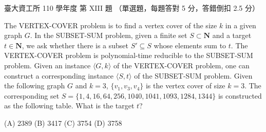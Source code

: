 \begin{pastexam}[label={px:npc-4}]{臺大資工所 110 學年度 第 XIII 題}
（單選題，每題答對 5 分，答錯倒扣 2.5 分）

The VERTEX-COVER problem is to find a vertex cover of the size $k$ in a given graph $G$. In the
SUBSET-SUM problem, given a finite set $S\subset\mathbf{N}$ and a target $t\in\mathbf{N}$, we ask whether
there is a subset $S'\subseteq S$ whose elements sum to $t$. The VERTEX-COVER problem is polynomial-time
reducible to the SUBSET-SUM problem. Given an instance $\langle G,k\rangle$ of the VERTEX-COVER problem, one
can construct a corresponding instance $\langle S,t\rangle$ of the SUBSET-SUM problem. Given the following
graph $G$ and $k=3$, $\{v_1,v_3,v_4\}$ is the vertex cover of size $k=3$. The corresponding set
$S=\{1,4,16,64,256,1040,1041,1093,1284,1344\}$ is constructed as the following table. What is the target
$t$?

(A) 2389 \qquad (B) 3417 \qquad (C) 3754 \qquad (D) 3758


\end{pastexam}

